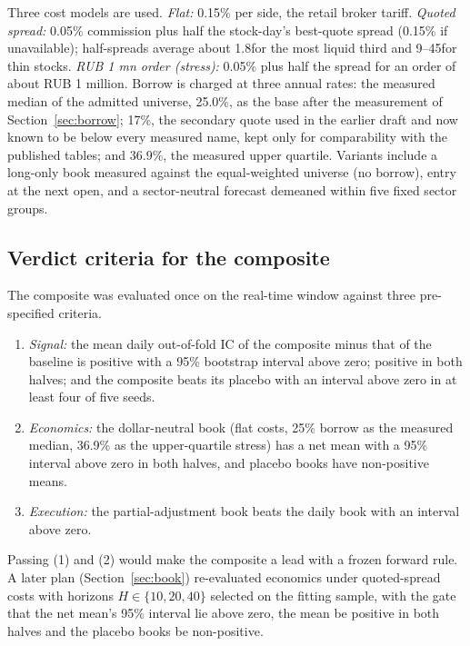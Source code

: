 Three cost models are used. \emph{Flat:} 0.15\% per side, the retail broker tariff. \emph{Quoted spread:} 0.05\% commission plus half the stock-day's best-quote spread (0.15\% if unavailable); half-spreads average about 1.8\bp for the most liquid third and 9--45\bp for thin stocks. \emph{RUB 1 mn order (stress):} 0.05\% plus half the spread for an order of about RUB 1 million. Borrow is charged at three annual rates: the measured median of the admitted universe, 25.0\%, as the base after the measurement of Section~\ref{sec:borrow}; 17\%, the secondary quote used in the earlier draft and now known to be below every measured name, kept only for comparability with the published tables; and 36.9\%, the measured upper quartile. Variants include a long-only book measured against the equal-weighted universe (no borrow), entry at the next open, and a sector-neutral forecast demeaned within five fixed sector groups.

\subsection{Verdict criteria for the composite}\label{sec:criteria}

The composite was evaluated once on the real-time window against three pre-specified criteria.
\begin{enumerate}[label=(\arabic*)]
\item \emph{Signal:} the mean daily out-of-fold IC of the composite minus that of the baseline is positive with a 95\% bootstrap interval above zero; positive in both halves; and the composite beats its placebo with an interval above zero in at least four of five seeds.
\item \emph{Economics:} the dollar-neutral book (flat costs, 25\% borrow as the measured median, 36.9\% as the upper-quartile stress) has a net mean with a 95\% interval above zero in both halves, and placebo books have non-positive means.
\item \emph{Execution:} the partial-adjustment book beats the daily book with an interval above zero.
\end{enumerate}
Passing (1) and (2) would make the composite a lead with a frozen forward rule. A later plan (Section~\ref{sec:book}) re-evaluated economics under quoted-spread costs with horizons $H\in\{10,20,40\}$ selected on the fitting sample, with the gate that the net mean's 95\% interval lie above zero, the mean be positive in both halves and the placebo books be non-positive.

